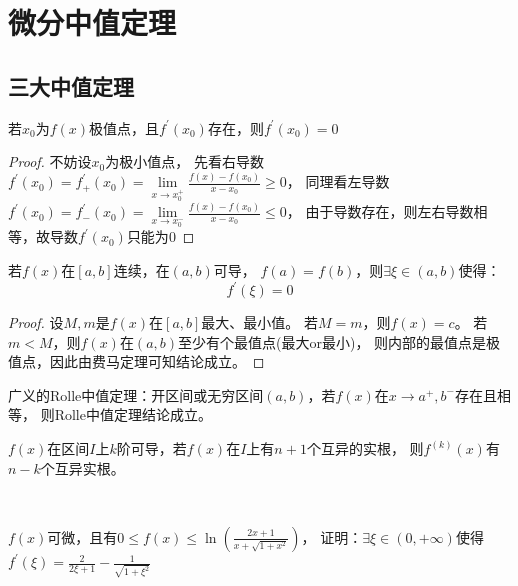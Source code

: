 \section{微分中值定理}

\subsection{三大中值定理}

\begin{theorem}[费马定理]
  若$x_0$为$f(x)$极值点，且$f^{\prime}(x_0)$存在，则$f^{\prime}(x_0) = 0$
\end{theorem}

\begin{proof}
  不妨设$x_0$为极小值点，
  先看右导数$f^{\prime}(x_0) = f^{\prime}_+(x_0) = \lim \limits _{x \rightarrow x_0^+}\frac{f(x) - f(x_0)}{x - x_0} \geq 0$，
  同理看左导数$f^{\prime}(x_0) = f^{\prime}_-(x_0) = \lim \limits _{x \rightarrow x_0^-} \frac{f(x) - f(x_0)}{x - x_0} \leq 0$，
  由于导数存在，则左右导数相等，故导数$f^{\prime}(x_0)$只能为$0$
\end{proof}

\begin{theorem}[Rolle中值定理]
  若$f(x)$在$[a,b]$连续，在$(a,b)$可导，
  $f(a) = f(b)$，则$\exists \xi \in (a,b)$使得：
  \begin{equation*}
    f^{\prime}(\xi)  = 0
  \end{equation*}
\end{theorem}

\begin{proof}
  设$M,m$是$f(x)$在$[a,b]$最大、最小值。
  若$M = m$，则$f(x) = c$。
  若$m < M$，则$f(x)$在$(a,b)$至少有个最值点(最大or最小)，
  则内部的最值点是极值点，因此由费马定理可知结论成立。
\end{proof}

\begin{note}
  广义的Rolle中值定理：开区间或无穷区间$(a,b)$，若$f(x)$在$x \rightarrow a^+,b^-$存在且相等，
  则Rolle中值定理结论成立。
\end{note}

\begin{corollary}[研究导函数零点情况]
  $f(x)$在区间$I$上$k$阶可导，若$f(x)$在$I$上有$n+1$个互异的实根，
  则$f^{(k)}(x)$有$n - k$个互异实根。
\end{corollary}

~

\begin{exercise}[广义Rolle的应用]
  $f(x)$可微，且有$0 \leq f(x) \leq \ln (\frac{2x+1}{x + \sqrt{1 + x^2}})$，
  证明：$\exists \xi \in (0,+\infty)$使得$f^{\prime}(\xi) = \frac{2}{2\xi + 1} - \frac{1}{\sqrt{1 + \xi^2}}$
\end{exercise}

